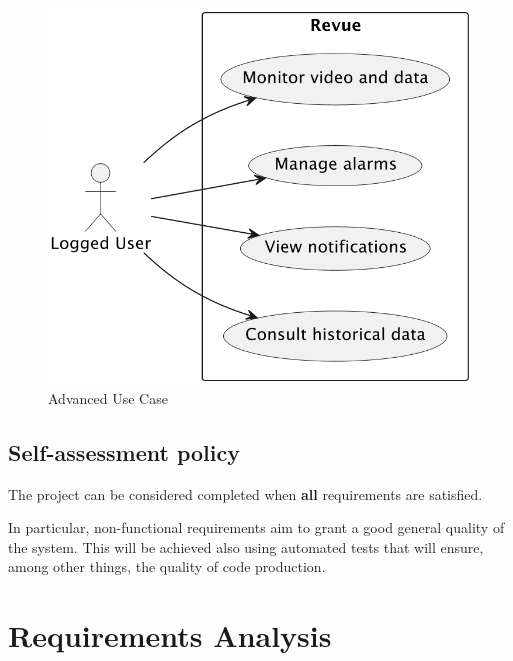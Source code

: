 \documentclass{scrartcl}
\begin{document}
    \begin{figure}
        \centering
        \includegraphics[scale=0.6]{img/advanced-use-case}
        \caption{Advanced Use Case}
        \label{fig:advanced-use-case}
    \end{figure}

    \subsection{Self-assessment policy}

    The project can be considered completed when \textbf{all} requirements are satisfied.

    In particular, non-functional requirements aim to grant a good general quality of the system.
    This will be achieved also using automated tests that will ensure, among other things, the quality of code production.

    \section{Requirements Analysis}

%
%

%
\end{document}
